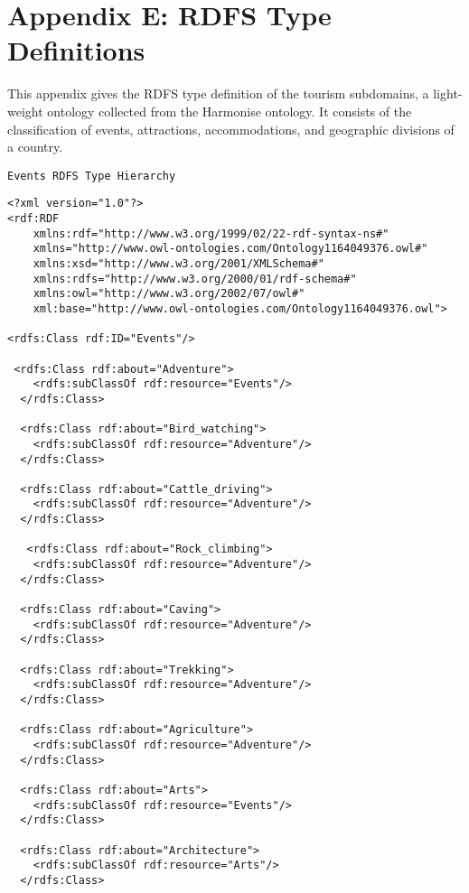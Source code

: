 \chapter*{Appendix E: RDFS Type Definitions}
\footnotesize
\hspace{0.3in}This appendix gives the RDFS type definition of the tourism subdomains, 
a light-weight ontology collected from the Harmonise ontology. It consists of the 
classification of events, attractions, accommodations, and geographic divisions of a 
country.

\singlespacing
\begin{verbatim}
Events RDFS Type Hierarchy 
\end{verbatim}
\begin{verbatim}
<?xml version="1.0"?>
<rdf:RDF
    xmlns:rdf="http://www.w3.org/1999/02/22-rdf-syntax-ns#"
    xmlns="http://www.owl-ontologies.com/Ontology1164049376.owl#"
    xmlns:xsd="http://www.w3.org/2001/XMLSchema#"
    xmlns:rdfs="http://www.w3.org/2000/01/rdf-schema#"
    xmlns:owl="http://www.w3.org/2002/07/owl#"
    xml:base="http://www.owl-ontologies.com/Ontology1164049376.owl">

<rdfs:Class rdf:ID="Events"/>
 
 <rdfs:Class rdf:about="Adventure">
    <rdfs:subClassOf rdf:resource="Events"/>
  </rdfs:Class>

  <rdfs:Class rdf:about="Bird_watching">
    <rdfs:subClassOf rdf:resource="Adventure"/>
  </rdfs:Class>
  
  <rdfs:Class rdf:about="Cattle_driving">
    <rdfs:subClassOf rdf:resource="Adventure"/>
  </rdfs:Class>
  
   <rdfs:Class rdf:about="Rock_climbing">
    <rdfs:subClassOf rdf:resource="Adventure"/>
  </rdfs:Class>
	
  <rdfs:Class rdf:about="Caving">
    <rdfs:subClassOf rdf:resource="Adventure"/>
  </rdfs:Class>	
  
  <rdfs:Class rdf:about="Trekking">
    <rdfs:subClassOf rdf:resource="Adventure"/>
  </rdfs:Class>	
       		
  <rdfs:Class rdf:about="Agriculture">
    <rdfs:subClassOf rdf:resource="Adventure"/>
  </rdfs:Class>	
			
  <rdfs:Class rdf:about="Arts">
    <rdfs:subClassOf rdf:resource="Events"/>
  </rdfs:Class>
  
  <rdfs:Class rdf:about="Architecture">
    <rdfs:subClassOf rdf:resource="Arts"/>
  </rdfs:Class>
  

\end{verbatim}
